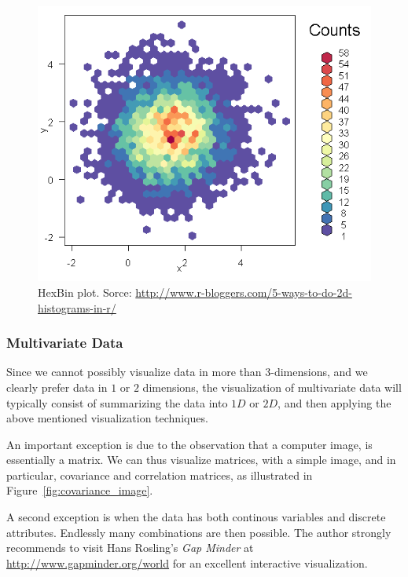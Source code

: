 \documentclass[12pt,a4paper]{report}
\begin{document}
\begin{figure}[h]
\centering
\includegraphics[height=0.3\textheight]{art/hexbin2}
\caption[HexBin Plot]{HexBin plot. Sorce: \url{http://www.r-bloggers.com/5-ways-to-do-2d-histograms-in-r/}}
\label{fig:hexbin}
\end{figure}






\subsubsection{Multivariate Data}
Since we cannot possibly visualize data in more than $3$-dimensions, and we clearly prefer data in $1$ or $2$ dimensions, the visualization of multivariate data will typically consist of summarizing the data into $1D$ or $2D$, and then applying the above mentioned visualization techniques.

An important exception is due to the observation that a computer image, is essentially a matrix. 
We can thus visualize matrices, with a simple image, and in particular, covariance and correlation matrices, as illustrated in Figure~\ref{fig:covariance_image}.

A second exception is when the data has both continous variables and discrete attributes. 
Endlessly many combinations are then possible.
The author strongly recommends to visit Hans Rosling's \emph{Gap Minder} at \url{http://www.gapminder.org/world} for an excellent interactive visualization. 
\end{document}

